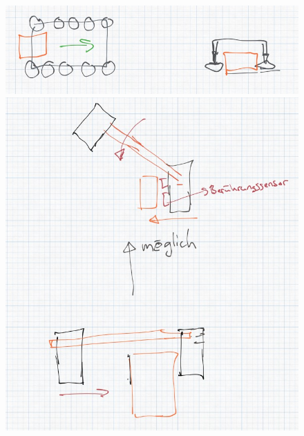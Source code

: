 \begin{figure}[h!]
    \centering
    \begin{minipage}{0.45\textwidth}
        \centering
        \includegraphics[width=\textwidth]{img/technologierecherche/Rotation/waescheanlage.jpg}
        \caption{}
        \label{img:tech_waescheanlage}
    \end{minipage}
    \hfill
    \begin{minipage}{0.45\textwidth}
        \centering
        \includegraphics[width=\textwidth]{img/technologierecherche/Aufnahme/Breiterweg_Griff.jpg}
        \caption{} 
        \label{img:tech_nichts}
    \end{minipage}
\end{figure}
